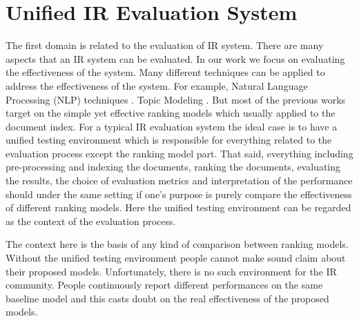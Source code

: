 \section{Unified IR Evaluation System}
The first domain is related to the evaluation of IR system. 
There are many aspects that an IR system can be evaluated. 
In our work we focus on evaluating the effectiveness of the system. 
Many different techniques can be applied to address the effectiveness of 
the system. For example, Natural Language Processing (NLP) techniques \cite{Voorhees:1999:NLP:645857.669935,Mihalcea:2011:GNL:1984806}. 
Topic Modeling \cite{Blei:2003:LDA:944919.944937,Hofmann:1999:PLS:312624.312649}.
But most of the previous works target on the simple yet effective ranking 
models which usually applied to the document index.
For a typical IR evaluation system the ideal case is to have a unified 
testing environment which is responsible for everything related 
to the evaluation process except the ranking model part. That said, everything 
including pre-processing and indexing the documents, ranking the documents, 
evaluating the results, the choice of evaluation metrics and interpretation of 
the performance should under the same setting if one's purpose is purely 
compare the effectiveness of different ranking models.
Here the unified testing environment can be regarded as the context of 
the evaluation process. 

The context here is the basis of any kind of comparison between ranking models. 
Without the unified testing environment people cannot make sound claim about 
their proposed models. Unfortunately, there is no such environment for the 
IR community. People continuously report different performances on the same 
baseline model \cite{Yang:2016:RSI:2970398.2970415} and this casts doubt on 
the real effectiveness of the proposed models.

